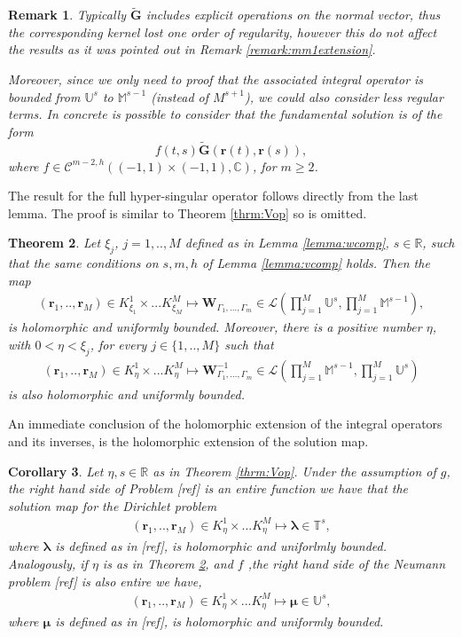 \documentclass{article}
\newtheorem{theorem}{Theorem}[section]
\newtheorem{corollary}[theorem]{Corollary}
\newtheorem{remark}[theorem]{Remark}
\newcommand{\todo}[1]{{\color{red}[#1]}}
\newcommand{\bmu} {\bm{\mu}}
\newcommand{\IC}{{\mathbb C}}
\newcommand{\IM}{{\mathbb M}}
\newcommand{\IR}{{\mathbb R}}
\newcommand{\IU}{{\mathbb U}}
\newcommand{\IT}{{\mathbb T}}
\newcommand{\cmspaceh}[4]{\mathcal{C}^{#1,#2} \left( #3, #4 \right)}
\newcommand{\bla}{\boldsymbol \lambda}
\newcommand{\br}{\bm{r}}
\newcommand{\iinterv}{(-1,1)\times(-1,1)}
\begin{document}
\begin{remark}
\label{remark:gtildereg}
Typically $\widetilde{\mathbf{G}}$ includes explicit operations on the normal vector, thus the corresponding kernel lost one order of regularity, however this do not affect the results as it was pointed out in Remark \ref{remark:mm1extension}.

Moreover, since we only need to proof that the associated integral operator is bounded from $\IU^s$ to $\IM^{s-1}$ (instead of $M^{s+1}$), we could also consider less regular terms. In concrete is possible to consider that the fundamental solution is of the form 
$$ f(t,s) \widetilde{\mathbf{G}}(\br(t),\br(s)),$$ where $f \in \cmspaceh{m-2}{h}{\iinterv}{\IC}$, for $m \geq 2$. 
\end{remark}

The result for the full hyper-singular operator follows directly from the last lemma. The proof is similar to Theorem \ref{thrm:Vop} so is omitted. 

\begin{theorem}
\label{thrm:Wop}
Let $\xi_j$, $j=1,..,M$ defined as in Lemma \ref{lemma:wcomp}, $s \in \IR$, such that the same conditions on $s,m,h$ of Lemma \ref{lemma:vcomp} holds. Then the map
\begin{align*}
(\br_1,..,\br_M) \in K^1_{\xi_1} \times ... K^M_{\xi_M} \mapsto 
\mathbf{W}_{\Gamma_1,\hdots,\Gamma_m} \in \mathcal{L}\left(\prod_{j=1}^M \IU^s, \prod_{j=1}^M \IM^{s-1}\right) ,
\end{align*}
is holomorphic and uniformly bounded. Moreover, there is a positive number $\eta$, with $0< \eta < \xi_j$, for every $j \in \{1,..,M\}$ such that 
\begin{align*}
(\br_1,..,\br_M) \in K^1_{\eta} \times ... K^M_{\eta} \mapsto 
\mathbf{W}_{\Gamma_1,\hdots,\Gamma_m}^{-1} \in \mathcal{L}(\prod_{j=1}^M \IM^{s-1}, \prod_{j=1}^M \IU^{s}) 
\end{align*}
is also holomorphic and uniformly bounded.
\end{theorem}

An immediate conclusion of the holomorphic extension of the integral operators and its inverses, is the holomorphic extension of the solution map. 

\begin{corollary}
\label{cor:solholom}
Let $\eta,s \in \IR $ as in Theorem \ref{thrm:Vop}. Under the assumption of $g$, the right hand side of Problem \todo{ref} is an entire function we have that the solution map for the Dirichlet problem 
\begin{align*}
(\br_1,..,\br_M) \in K^1_{\eta} \times ... K^M_{\eta} \mapsto 
\bla \in \IT^{s},
\end{align*}
where $\bla$ is defined as in \todo{ref}, is holomorphic and uniforlmly bounded. Analogously, if $\eta$ is as in Theorem \ref{thrm:Wop}, and $f$ ,the right hand side of the Neumann problem \todo{ref} is also entire we have, 
\begin{align*}
(\br_1,..,\br_M) \in K^1_{\eta} \times ... K^M_{\eta} \mapsto 
\bmu \in \IU^{s},
\end{align*}
where $\bmu$ is defined as in \todo{ref}, is holomorphic and uniformly bounded.
\end{corollary}
\end{document}
